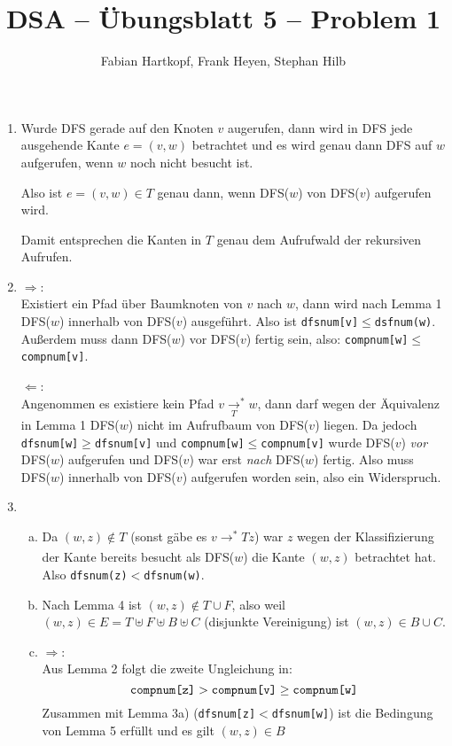 \documentclass[a4paper]{scrartcl}
\author{Fabian Hartkopf, Frank Heyen, Stephan Hilb}
\title{DSA – Übungsblatt 5 – Problem 1}
\newcommand{\pfad}[1][]{\underset{#1}{\longrightarrow}^*}
\begin{document}
\maketitle

\begin{enumerate}
\item
Wurde DFS gerade auf den Knoten $v$ augerufen, dann wird in DFS jede ausgehende Kante $e=(v,w)$ betrachtet und es wird genau dann DFS auf $w$ aufgerufen, wenn $w$ noch nicht besucht ist.

Also ist $e=(v,w)\in T$ genau dann, wenn DFS($w$) von DFS($v$) aufgerufen wird.

Damit entsprechen die Kanten in $T$ genau dem Aufrufwald der rekursiven Aufrufen.

\item

$\Longrightarrow$:\\
Existiert ein Pfad über Baumknoten von $v$ nach $w$, dann wird nach Lemma 1 DFS($w$) innerhalb von DFS($v$) ausgeführt.
Also ist \verb|dfsnum[v]|$\le$\verb|dsfnum(w)|.
Außerdem muss dann DFS($w$) vor DFS($v$) fertig sein, also: \verb|compnum[w]|$\le$\verb|compnum[v]|.

$\Longleftarrow$:\\
Angenommen es existiere kein Pfad $v\pfad[T] w$, dann darf wegen der Äquivalenz in Lemma 1 DFS($w$) nicht im Aufrufbaum von DFS($v$) liegen.
Da jedoch \verb|dfsnum[w]|$\ge$\verb|dfsnum[v]| und \verb|compnum[w]|$\le$\verb|compnum[v]| wurde DFS($v$) \emph{vor} DFS($w$) aufgerufen und DFS($v$) war erst \emph{nach} DFS($w$) fertig.
Also muss DFS($w$) innerhalb von DFS($v$) aufgerufen worden sein, also ein Widerspruch.

\item

\begin{enumerate}[(a)]
\item
Da $(w,z)\not\in T$ (sonst gäbe es $v\pfad{T}z$) war $z$ wegen der Klassifizierung der Kante bereits besucht als DFS($w$) die Kante $(w,z)$ betrachtet hat.
Also \verb|dfsnum(z)|$<$\verb|dfsnum(w)|.

\item
Nach Lemma 4 ist $(w,z)\not\in T\cup F$, also weil $(w,z)\in E = T\uplus F\uplus B\uplus C$ (disjunkte Vereinigung) ist $(w,z)\in B\cup C$.

\item
$\Longrightarrow$:\\
Aus Lemma 2 folgt die zweite Ungleichung in:
\[
\verb|compnum[z]|>\verb|compnum[v]|\ge \verb|compnum[w]|
\]
Zusammen mit Lemma 3a) (\verb|dfsnum[z]|$<$\verb|dfsnum[w]|) ist die Bedingung von Lemma 5 erfüllt und es gilt $(w,z)\in B$


\end{enumerate}
\end{enumerate}
\end{document}
